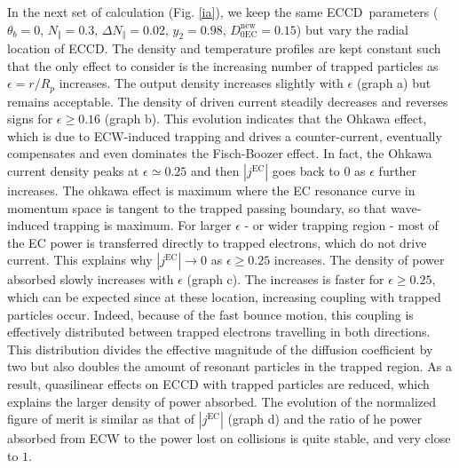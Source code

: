 In the next set of calculation (Fig. \ref{ia}), we keep the same
ECCD\ parameters ($\theta_{b}=0$, $N_{\Vert}=0.3$, $\Delta N_{\Vert}=0.02$,
$y_{2}=0.98$, $D_{0\text{EC}}^{\text{new}}=0.15$) but vary the radial location
of ECCD. The density and temperature profiles are kept constant such that the
only effect to consider is the increasing number of trapped particles as
$\epsilon=r/R_{p}$ increases. The output density increases slightly with
$\epsilon$ (graph a) but remains acceptable. The density of driven current
steadily decreases and reverses signs for $\epsilon\geq0.16$ (graph b). This
evolution indicates that the Ohkawa effect, which is due to ECW-induced
trapping and drives a counter-current, eventually compensates and even
dominates the Fisch-Boozer effect. In fact, the Ohkawa current density peaks
at $\epsilon\simeq0.25$ and then $\left|  j^{\text{EC}}\right|  $ goes back to
$0$ as $\epsilon$ further increases. The ohkawa effect is maximum where the EC
resonance curve in momentum space is tangent to the trapped passing boundary,
so that wave-induced trapping is maximum. For larger $\epsilon$ - or wider
trapping region - most of the EC power is transferred directly to trapped
electrons, which do not drive current. This explains why $\left|
j^{\text{EC}}\right|  \rightarrow0$ as $\epsilon\geq0.25$ increases. The
density of power absorbed slowly increases with $\epsilon$ (graph c). The
increases is faster for $\epsilon\geq0.25$, which can be expected since at
these location, increasing coupling with trapped particles occur. Indeed,
because of the fast bounce motion, this coupling is effectively distributed
between trapped electrons travelling in both directions. This distribution
divides the effective magnitude of the diffusion coefficient by two but also
doubles the amount of resonant particles in the trapped region. As a result,
quasilinear effects on ECCD with trapped particles are reduced, which explains
the larger density of power absorbed. The evolution of the normalized figure
of merit is similar as that of $\left|  j^{\text{EC}}\right|  $ (graph d) and
the ratio of he power absorbed from ECW to the power lost on collisions is
quite stable, and very close to $1$.

